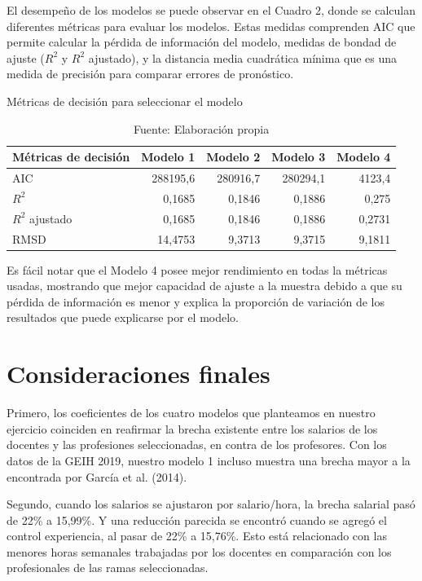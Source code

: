 \documentclass[a4paper]{article}
\begin{document}
El desempeño de los modelos se puede observar en el Cuadro 2, donde se calculan diferentes métricas para evaluar los modelos. Estas medidas comprenden AIC que permite calcular la pérdida de información del modelo, medidas de bondad de ajuste ($R^2$ y $R^2$ ajustado), y la 	distancia media cuadrática mínima que es una medida de precisión para comparar errores de pronóstico.

\begin{table}[htbp]
	\centering
	\caption{Métricas de decisión para seleccionar el modelo}
	\begin{tabular}{|l|r|r|r|r|}
		\toprule
		\textbf{Métricas de decisión} & \multicolumn{1}{l|}{\textbf{Modelo 1}} & \multicolumn{1}{l|}{\textbf{Modelo 2}} & \multicolumn{1}{l|}{\textbf{Modelo 3}} & \multicolumn{1}{l|}{\textbf{Modelo 4}} \\
		\midrule
		AIC   & 288195,6 & 280916,7 & 280294,1 & 4123,4 \\
		$R^2$    & 0,1685 & 0,1846 & 0,1886 & 0,275 \\
		$R^2$ ajustado & 0,1685 & 0,1846 & 0,1886 & 0,2731 \\
		RMSD  & 14,4753 & 9,3713 & 9,3715 & 9,1811 \\
		\bottomrule
	\end{tabular}
	\caption*{Fuente: Elaboración propia}
	\label{tab:metricas}
\end{table} 

Es fácil notar que el Modelo 4 posee mejor rendimiento en todas la métricas usadas, mostrando que mejor capacidad de ajuste a la muestra debido a que su pérdida de información es menor y explica la proporción de variación de los resultados que puede explicarse por el modelo.

    \section{Consideraciones finales}
Primero, los coeficientes de los cuatro modelos que planteamos en nuestro ejercicio coinciden en reafirmar la brecha existente entre los salarios de los docentes y las profesiones seleccionadas, en contra de los profesores. Con los datos de la GEIH 2019, nuestro modelo 1 incluso muestra una brecha mayor a la encontrada por García et al. (2014).

Segundo, cuando los salarios se ajustaron por salario/hora, la brecha salarial pasó de 22\% a 15,99\%. Y una reducción parecida se encontró cuando se agregó el control experiencia, al pasar de 22\% a 15,76\%. Esto está relacionado con las menores horas semanales trabajadas por los docentes en comparación con los profesionales de las ramas seleccionadas.
\end{document}

